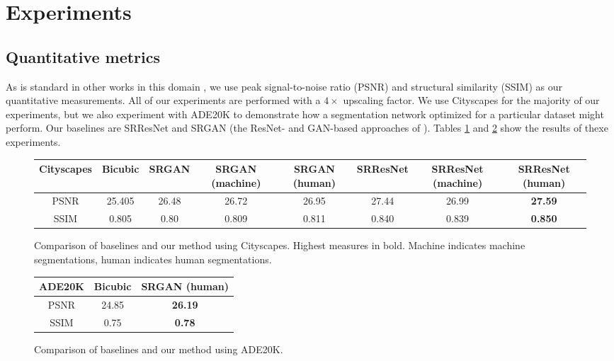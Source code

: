 \documentclass[10pt,twocolumn,letterpaper]{article}
\begin{document}

\section{Experiments}
\label{sec:results}

\subsection{Quantitative metrics}
As is standard in other works in this domain \cite{SRCNN, SRGAN,
PerceptualLosses, DeeplyRecursive}, we use peak signal-to-noise ratio (PSNR)
and structural similarity (SSIM) as our quantitative measurements. All of our
experiments are performed with a $4 \times$ upscaling factor. We use Cityscapes
for the majority of our experiments, but we also experiment with ADE20K to
demonstrate how a segmentation network optimized for a particular dataset might
perform. Our baselines are SRResNet and SRGAN (the ResNet- and GAN-based
approaches of \cite{SRGAN}). Tables \ref{fig:quantResultsCityscapes} and
\ref{fig:quantResultsADE} show the results of thexe experiments.

\begin{figure}[ht!]
    \begin{centering}
        \small
        \begin{tabular}{c ccccccc}
            \textbf{Cityscapes} & Bicubic & SRGAN & SRGAN (machine) & SRGAN
            (human) & SRResNet & SRResNet (machine) & SRResNet (human) \\
            \hline
            PSNR & 25.405 & 26.48 & 26.72 & 26.95 & 27.44 & 26.99 &
            \textbf{27.59} \\
            SSIM & 0.805 & 0.80 & 0.809 & 0.811 & 0.840 & 0.839 &
            \textbf{0.850}
        \end{tabular}
    \end{centering}
    \caption{Comparison of baselines and our method using Cityscapes. Highest
    measures in bold. Machine indicates machine segmentations, human indicates
    human segmentations.}
    \label{fig:quantResultsCityscapes}
\end{figure}

\begin{figure}[ht!]
    \begin{center}
        \small
        \begin{tabular}{c cc}
            \textbf{ADE20K} & Bicubic & SRGAN (human) \\
            \hline
            PSNR & 24.85 & \textbf{26.19} \\
            SSIM & 0.75 & \textbf{0.78}
        \end{tabular}
    \end{center}
    \caption{Comparison of baselines and our method using ADE20K.}
    \label{fig:quantResultsADE}
\end{figure}
\end{document}
